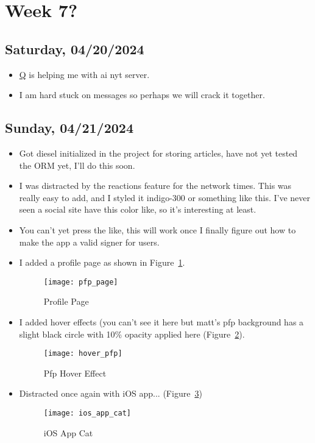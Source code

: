 \newpage
\section{Week 7?}
\subsection*{Saturday, 04/20/2024}
\begin{itemize}
    \item \textcolor{blue}{\href{https://github.com/queazyg}{Q}} is helping me with ai nyt server.
    \item I am hard stuck on messages so perhaps we will crack it together.
\end{itemize}

\subsection*{Sunday, 04/21/2024}
\begin{itemize}
    \item Got diesel initialized in the project for storing articles, have not
        yet tested the ORM yet, I'll do this soon. 
    \item I was distracted by the reactions feature for the network times. This
        was really easy to add, and I styled it indigo-300 or something like
        this. I've never seen a social site have this color like, so it's
        interesting at least.
    \item You can't yet press the like, this will work once I finally figure out
        how to make the app a valid signer for users.
    \item I added a profile page as shown in Figure~\ref{fig:pfp_page}.
        \begin{figure}[ht]
            \centering
            \texttt{[image: pfp\_page]}
            \captionsetup{labelfont=bf, textfont=it}
            \caption{Profile Page}
            \label{fig:pfp_page}
        \end{figure}
    \item I added hover effects (you can't see it here but matt's pfp background
        has a slight black circle with 10\% opacity applied here
        (Figure~\ref{fig:hover_pfp}).
        \begin{figure}[ht]
            \centering
            \texttt{[image: hover\_pfp]}
            \captionsetup{labelfont=bf, textfont=it}
            \caption{Pfp Hover Effect}
            \label{fig:hover_pfp}
        \end{figure}
        \newpage
    \item Distracted once again with iOS app... (Figure~\ref{fig:ios_app_cat})
        \begin{figure}[ht]
            \centering
            \texttt{[image: ios\_app\_cat]}
            \captionsetup{labelfont=bf, textfont=it}
            \caption{iOS App Cat}
            \label{fig:ios_app_cat}
        \end{figure}
\end{itemize}

